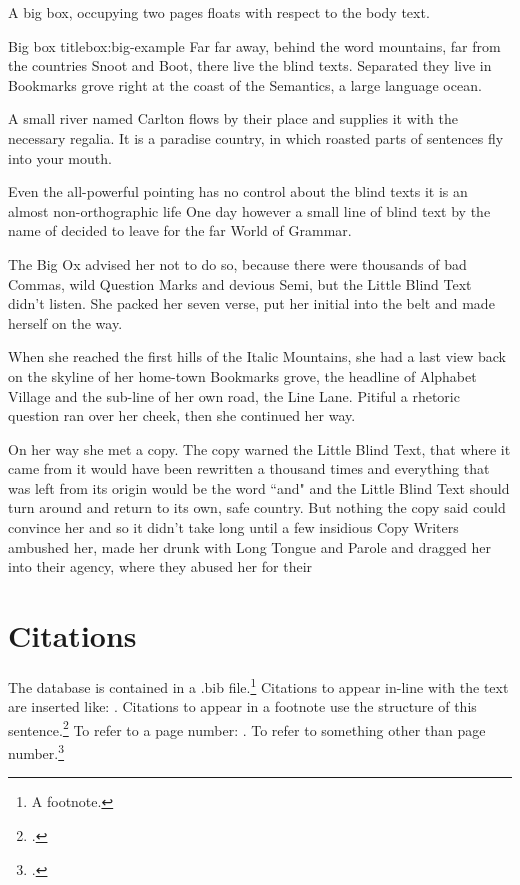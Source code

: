 \documentclass{grattan}
\begin{document}
A big box, occupying two pages floats with respect to the body text.

\begin{bigbox*}{Big box title}{box:big-example}
Far far away, behind the word mountains, far from the countries Snoot and Boot, there live the blind texts.
Separated they live in Bookmarks grove right at the coast of the Semantics, a large language ocean.

A small river named Carlton flows by their place and supplies it with the necessary regalia.
It is a paradise country, in which roasted parts of sentences fly into your mouth.

Even the all-powerful pointing has no control about the blind texts it is an almost non-orthographic life One day however a small line of blind text by the name of  decided to leave for the far World of Grammar.

The Big Ox advised her not to do so, because there were thousands of bad Commas, wild Question Marks and devious Semi, but the Little Blind Text didn't listen.
She packed her seven verse, put her initial into the belt and made herself on the way.

When she reached the first hills of the Italic Mountains, she had a last view back on the skyline of her home-town Bookmarks grove, the headline of Alphabet Village and the sub-line of her own road, the Line Lane.
Pitiful a rhetoric question ran over her cheek, then she continued her way.

On her way she met a copy.
The copy warned the Little Blind Text, that where it came from it would have been rewritten a thousand times and everything that was left from its origin would be the word ``and" and the Little Blind Text should turn around and return to its own, safe country.
But nothing the copy said could convince her and so it didn't take long until a few insidious Copy Writers ambushed her, made her drunk with Long Tongue and Parole and dragged her into their agency, where they abused her for their
\end{bigbox*}

\chapter{Citations}\label{chap:citations}
The database is contained in a .bib file.\footnote{A footnote.} 
Citations to appear in-line with the text are inserted like: \textcite{Daley-etal-2016-SAPTO}.
Citations to appear in a footnote use the structure of this sentence.\footcite{Daley-etal-2016-Assessing-2016-super-tax-reforms}
To refer to a page number: \textcite[][30]{Daley-etal-2016-SAPTO}.
To refer to something other than page number.\footcite[][Chapter~4]{Daley-etal-2016-SAPTO}
\end{document}

